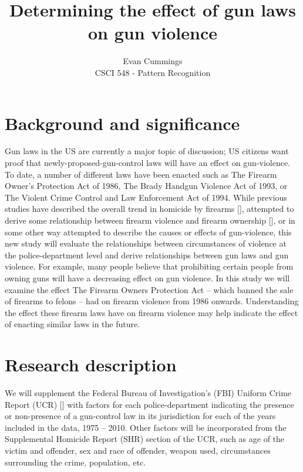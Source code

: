 

\usepackage[backend=biber, style=authoryear, sorting=nyt]{biblatex}
\renewcommand*{\bibfont}{\normalsize}




\title{Determining the effect of gun laws on gun violence}
\author{Evan Cummings\\
CSCI 548 - Pattern Recognition}

\maketitle

\section{Background and significance}

Gun laws in the US are currently a major topic of discussion; US citizens want proof that newly-proposed-gun-control laws will have an effect on gun-violence.  To date, a number of different laws have been enacted such as The Firearm Owner's Protection Act of 1986, The Brady Handgun Violence Act of 1993, or The Violent Crime Control and Law Enforcement Act of 1994.  While previous studies have described the overall trend in homicide by firearms [\cite{cooper}], attempted to derive some relationship between firearm violence and firearm ownership [\cite{swedler}], or in some other way attempted to describe the causes or effects of gun-violence, this new study will evaluate the relationships between circumstances of violence at the police-department level and derive relationships between gun laws and gun violence.  For example, many people believe that prohibiting certain people from owning guns will have a decreasing effect on gun violence.  In this study we will examine the effect The Firearm Owners Protection Act -- which banned the sale of firearms to felons -- had on firearm violence from 1986 onwards.  Understanding the effect these firearm laws have on firearm violence may help indicate the effect of enacting similar laws in the future.

\section{Research description}

We will supplement the Federal Bureau of Investigation's (FBI) Uniform Crime Report (UCR) [\cite{shr}] with factors for each police-department indicating the presence or non-presence of a gun-control law in its jurisdiction for each of the years included in the data, 1975 -- 2010.  Other factors will be incorporated from the Supplemental Homicide Report (SHR) section of the UCR, such as age of the victim and offender, sex and race of offender, weapon used, circumstances surrounding the crime, population, etc.

